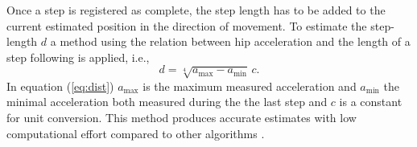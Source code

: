 \documentclass[engproc,conferenceproceedings,submit,pdftex,moreauthors]{Definitions/mdpi}
\begin{document}
Once  a step is registered as complete, the step length has to be added to the current estimated position in the direction of movement. To estimate the step-length $d$ a method  using the relation between hip acceleration and the length of a step following  \cite{weinberg2002} is applied, i.e.,
 \begin{equation}\label{eq:dist}
	d = \sqrt[4]{a_{\max}-a_{\min}}  \, c.
\end{equation}
In equation (\ref{eq:dist})  $a_{\max}$ is the maximum measured acceleration  and $a_{\min}$ the minimal  acceleration both measured during the the last step and $c$ is a constant for unit conversion. This method produces accurate estimates with low computational effort compared to other algorithms \cite{petukhov2022, shin2007, zizzo2017}.



 
\end{document}
